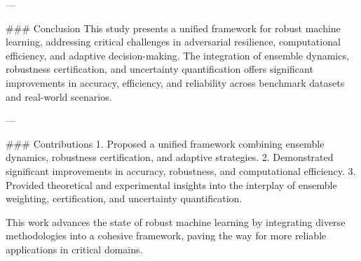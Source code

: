 ---

### Conclusion
This study presents a unified framework for robust machine learning, addressing critical challenges in adversarial resilience, computational efficiency, and adaptive decision-making. The integration of ensemble dynamics, robustness certification, and uncertainty quantification offers significant improvements in accuracy, efficiency, and reliability across benchmark datasets and real-world scenarios.

---

### Contributions
1. Proposed a unified framework combining ensemble dynamics, robustness certification, and adaptive strategies.
2. Demonstrated significant improvements in accuracy, robustness, and computational efficiency.
3. Provided theoretical and experimental insights into the interplay of ensemble weighting, certification, and uncertainty quantification.

This work advances the state of robust machine learning by integrating diverse methodologies into a cohesive framework, paving the way for more reliable applications in critical domains.